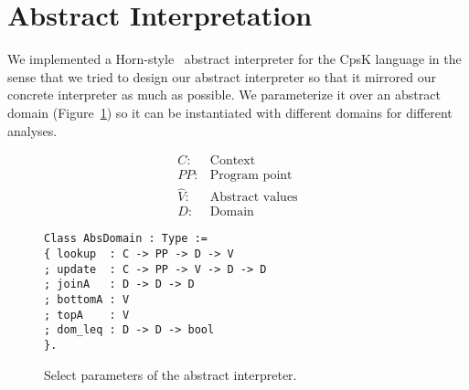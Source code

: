 \documentclass{article}
\begin{document}
\section{Abstract Interpretation}
\label{sec:abstract-interp}

We implemented a Horn-style~\cite{van2010abstracting} abstract interpreter for the CpsK language in the sense that we tried to design our abstract interpreter so that it mirrored our concrete interpreter as much as possible. We parameterize it over an abstract domain (Figure~\ref{fig:absinterp}) so it can be instantiated with different domains for different analyses. 

\begin{figure}
\centering
\begin{minipage}[t]{.2\textwidth}
\begin{align*}
C: & \text{Context} \\
PP: & \text{Program point} \\
\hat{V}: & \text{Abstract values} \\
D: & \text{Domain}
\end{align*}
\end{minipage}
\hspace{20pt}
\begin{minipage}[t]{.43\textwidth}
\begin{lstlisting}
Class AbsDomain : Type :=
{ lookup  : C -> PP -> D -> V
; update  : C -> PP -> V -> D -> D
; joinA   : D -> D -> D
; bottomA : V 
; topA    : V 
; dom_leq : D -> D -> bool
}.
\end{lstlisting}
\end{minipage}
\caption{Select parameters of the abstract interpreter.}
\label{fig:absinterp}
\end{figure}
\end{document}
